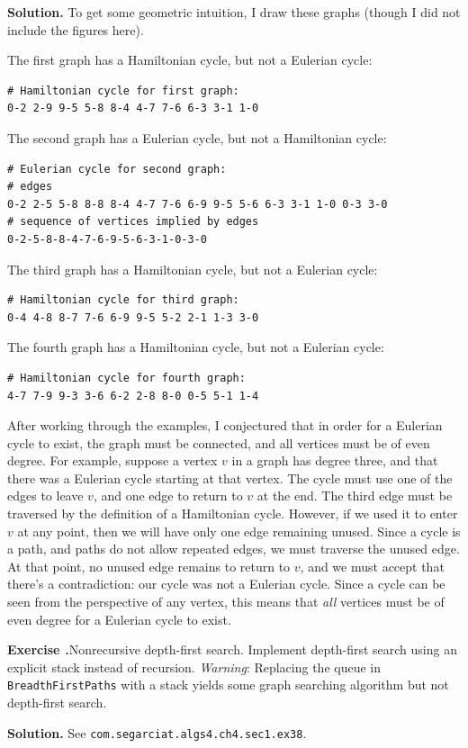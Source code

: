 \documentclass[12pt, a4paper]{article}
\newenvironment{ex}[2][Exercise]
{\par\medskip\noindent \textbf{#1 #2.}}
{\medskip}
\newenvironment{sol}[1][Solution]
{\par\medskip\noindent \textbf{#1.} }
{\medskip}
\begin{document}
	\begin{sol}
		To get some geometric intuition, I draw these graphs (though I did not
		include the figures here).
		
		The first graph has a Hamiltonian cycle, but not a Eulerian cycle:
		\begin{lstlisting}[language={}]
# Hamiltonian cycle for first graph:
0-2 2-9 9-5 5-8 8-4 4-7 7-6 6-3 3-1 1-0
		\end{lstlisting}
		The second graph has a Eulerian cycle, but not a Hamiltonian cycle:
		\begin{lstlisting}[language={}]
# Eulerian cycle for second graph:
# edges
0-2 2-5 5-8 8-8 8-4 4-7 7-6 6-9 9-5 5-6 6-3 3-1 1-0 0-3 3-0
# sequence of vertices implied by edges
0-2-5-8-8-4-7-6-9-5-6-3-1-0-3-0
		\end{lstlisting}
		The third graph has a Hamiltonian cycle, but not a Eulerian cycle:
		\begin{lstlisting}[language={}]
# Hamiltonian cycle for third graph:
0-4 4-8 8-7 7-6 6-9 9-5 5-2 2-1 1-3 3-0
		\end{lstlisting}
		The fourth graph has a Hamiltonian cycle, but not a Eulerian cycle:
		\begin{lstlisting}[language={}]
# Hamiltonian cycle for fourth graph:
4-7 7-9 9-3 3-6 6-2 2-8 8-0 0-5 5-1 1-4
		\end{lstlisting}
		After working through the examples, I conjectured that in order for
		a Eulerian cycle to exist, the graph must be connected, and all vertices
		must be of even degree. For example, suppose a vertex $v$ in a graph has
		degree three, and that there was a Eulerian cycle starting at that vertex.
		The cycle must use one of the edges to leave $v$, and one edge to return
		to $v$ at the end. The third edge must be traversed by the definition
		of a Hamiltonian cycle. However, if we used it to enter $v$ at any
		point, then we will have only one edge remaining unused. Since
		a cycle is a path, and paths do not allow repeated edges, we must
		traverse the unused edge. At that point, no unused edge remains to
		return to $v$, and we must accept that there's a contradiction:
		our cycle was not a Eulerian cycle. Since a cycle can be seen from
		the perspective of any vertex, this means that \emph{all} vertices must
		be of even degree for a Eulerian cycle to exist.
	\end{sol}
	\begin{ex}{38}
		\emph{Nonrecursive depth-first search}. Implement depth-first search using an
		explicit stack instead of recursion. \emph{Warning}: Replacing the queue in
		\texttt{BreadthFirstPaths} with a stack yields some graph searching algorithm
		but not depth-first search.
	\end{ex}
	\begin{sol}
		See \texttt{com.segarciat.algs4.ch4.sec1.ex38}.
	\end{sol}
	\pagebreak
	\printbibliography
\end{document}
